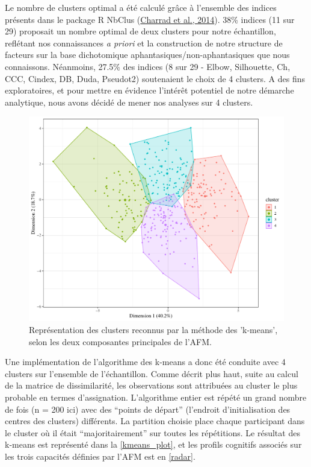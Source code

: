 \documentclass[
  12pt,
]{article}
\begin{document}
Le nombre de clusters optimal a été calculé grâce à l'ensemble des
indices présents dans le package R NbClus
(\protect\hyperlink{ref-charradNbClustPackageDetermining2014}{Charrad et
al., 2014}). 38\% indices (11 sur 29) proposait un nombre optimal de
deux clusters pour notre échantillon, reflétant nos connaissances
\emph{a priori} et la construction de notre structure de facteurs sur la
base dichotomique aphantasiques/non-aphantasiques que nous connaissons.
Néanmoins, 27.5\% des indices (8 sur 29 - Elbow, Silhouette, Ch, CCC,
Cindex, DB, Duda, Pseudot2) soutenaient le choix de 4 clusters. A des
fins exploratoires, et pour mettre en évidence l'intérêt potentiel de
notre démarche analytique, nous avons décidé de mener nos analyses sur 4
clusters.

\begin{figure}[h]

\includegraphics[width=\textwidth,height=0.5\textheight]{aphantasia_quarto_files/figure-pdf/kmeans_plot-1.pdf}

\caption{Représentation des clusters reconnus par la méthode des 'k-means', selon les deux composantes principales de l'AFM.}
\label{kmeans_plot}
\end{figure}

Une implémentation de l'algorithme des k-means a donc été conduite avec
4 clusters sur l'ensemble de l'échantillon. Comme décrit plus haut,
suite au calcul de la matrice de dissimilarité, les observations sont
attribuées au cluster le plus probable en termes d'assignation.
L'algorithme entier est répété un grand nombre de fois (n = 200 ici)
avec des ``points de départ'' (l'endroit d'initialisation des centres
des clusters) différents. La partition choisie place chaque participant
dans le cluster où il était ``majoritairement'' sur toutes les
répétitions. Le résultat des k-means est représenté dans la
\autoref{kmeans_plot}, et les profils cognitifs associés sur les trois
capacités définies par l'AFM est en \autoref{radar}.
\end{document}
